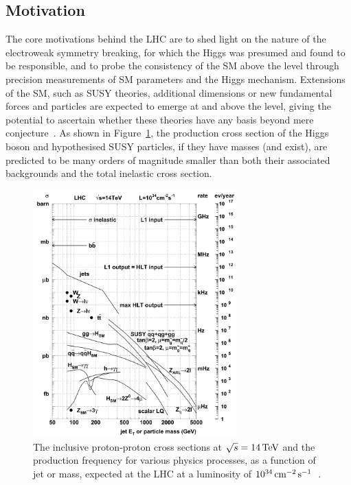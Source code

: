 \subsection{Motivation}\label{subsec:lhcMotivation}
The core motivations behind the LHC are to shed light on the nature of the electroweak symmetry breaking, for which the Higgs was presumed and found to be responsible, and to probe the consistency of the SM above the \TeV level through precision measurements of SM parameters and the Higgs mechanism.
Extensions of the SM, such as SUSY theories, additional dimensions or new fundamental forces and particles are expected to emerge at and above the \TeV level, giving the potential to ascertain whether these theories have any basis beyond mere conjecture~\cite{Bayatian:2006zz}.
As shown in Figure~\ref{fig:crossSections}, the production cross section of the Higgs boson and hypothesised SUSY particles, if they have \TeV masses (and exist), are predicted to be many orders of magnitude smaller than both their associated backgrounds and the total inelastic cross section.

\begin{figure}[htb]
\begin{center}
\includegraphics[width=0.70\textwidth]{figs/cms/crossSections.pdf}
\caption{The inclusive proton-proton cross sections at $\sqrt{s} = 14\,\text{Te\hspace{-.08em}V}$ and the production frequency for various physics processes, as a function of jet \ET or mass, expected at the LHC at a luminosity of $10^{34}\,\text{cm}^\text{$-$2}\,\text{s}^\text{$-$1}$~\cite{Dasu:2000ge}.}
\label{fig:crossSections}
\end{center}
\end{figure}

